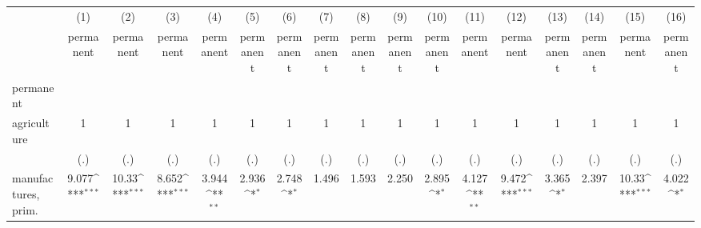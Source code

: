 {
\def\sym#1{\ifmmode^{#1}\else\(^{#1}\)\fi}
\begin{tabular}{l*{16}{c}}
\hline\hline
                    &\multicolumn{1}{c}{(1)}&\multicolumn{1}{c}{(2)}&\multicolumn{1}{c}{(3)}&\multicolumn{1}{c}{(4)}&\multicolumn{1}{c}{(5)}&\multicolumn{1}{c}{(6)}&\multicolumn{1}{c}{(7)}&\multicolumn{1}{c}{(8)}&\multicolumn{1}{c}{(9)}&\multicolumn{1}{c}{(10)}&\multicolumn{1}{c}{(11)}&\multicolumn{1}{c}{(12)}&\multicolumn{1}{c}{(13)}&\multicolumn{1}{c}{(14)}&\multicolumn{1}{c}{(15)}&\multicolumn{1}{c}{(16)}\\
                    &\multicolumn{1}{c}{permanent}&\multicolumn{1}{c}{permanent}&\multicolumn{1}{c}{permanent}&\multicolumn{1}{c}{permanent}&\multicolumn{1}{c}{permanent}&\multicolumn{1}{c}{permanent}&\multicolumn{1}{c}{permanent}&\multicolumn{1}{c}{permanent}&\multicolumn{1}{c}{permanent}&\multicolumn{1}{c}{permanent}&\multicolumn{1}{c}{permanent}&\multicolumn{1}{c}{permanent}&\multicolumn{1}{c}{permanent}&\multicolumn{1}{c}{permanent}&\multicolumn{1}{c}{permanent}&\multicolumn{1}{c}{permanent}\\
\hline
permanent           &                     &                     &                     &                     &                     &                     &                     &                     &                     &                     &                     &                     &                     &                     &                     &                     \\
agriculture         &           1         &           1         &           1         &           1         &           1         &           1         &           1         &           1         &           1         &           1         &           1         &           1         &           1         &           1         &           1         &           1         \\
                    &         (.)         &         (.)         &         (.)         &         (.)         &         (.)         &         (.)         &         (.)         &         (.)         &         (.)         &         (.)         &         (.)         &         (.)         &         (.)         &         (.)         &         (.)         &         (.)         \\
[1em]
manufactures, prim. &       9.077\sym{***}&       10.33\sym{***}&       8.652\sym{***}&       3.944\sym{**} &       2.936\sym{*}  &       2.748\sym{*}  &       1.496         &       1.593         &       2.250         &       2.895\sym{*}  &       4.127\sym{**} &       9.472\sym{***}&       3.365\sym{*}  &       2.397         &       10.33\sym{***}&       4.022\sym{*}  \\

\end{tabular}}
